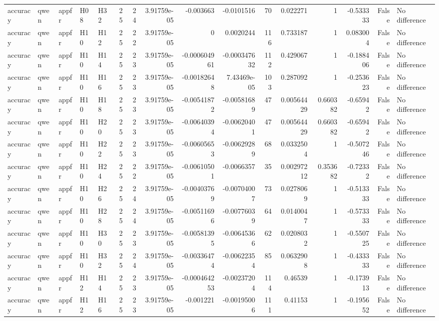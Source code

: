 \begin{longtable}{lllllrrrrrrrrrrl}
accuracy & qwen & appfr & H08 & H32 & 25 & 24 & 3.91759e-05 & -0.003663 & -0.0101516 & 70 & 0.022271 & 1 & -0.533333 & False & No difference \\
accuracy & qwen & appfr & H10 & H12 & 25 & 22 & 3.91759e-05 & 0 & 0.0020244 & 116 & 0.733187 & 1 & 0.083004 & False & No difference \\
accuracy & qwen & appfr & H10 & H14 & 25 & 23 & 3.91759e-05 & -0.000604961 & -0.000347632 & 112 & 0.429067 & 1 & -0.188406 & False & No difference \\
accuracy & qwen & appfr & H10 & H16 & 25 & 23 & 3.91759e-05 & -0.00182648 & 7.43469e-05 & 103 & 0.287092 & 1 & -0.253623 & False & No difference \\
accuracy & qwen & appfr & H10 & H18 & 25 & 23 & 3.91759e-05 & -0.00541872 & -0.00581689 & 47 & 0.00564429 & 0.660382 & -0.65942 & False & No difference \\
accuracy & qwen & appfr & H10 & H20 & 25 & 23 & 3.91759e-05 & -0.00640394 & -0.00620401 & 47 & 0.00564429 & 0.660382 & -0.65942 & False & No difference \\
accuracy & qwen & appfr & H10 & H22 & 25 & 23 & 3.91759e-05 & -0.00605653 & -0.00629289 & 68 & 0.0332504 & 1 & -0.507246 & False & No difference \\
accuracy & qwen & appfr & H10 & H24 & 25 & 22 & 3.91759e-05 & -0.00610501 & -0.0066357 & 35 & 0.00297212 & 0.353682 & -0.72332 & False & No difference \\
accuracy & qwen & appfr & H10 & H26 & 25 & 24 & 3.91759e-05 & -0.00403769 & -0.00704007 & 73 & 0.0278069 & 1 & -0.513333 & False & No difference \\
accuracy & qwen & appfr & H10 & H28 & 25 & 24 & 3.91759e-05 & -0.00511696 & -0.00776039 & 64 & 0.0140047 & 1 & -0.573333 & False & No difference \\
accuracy & qwen & appfr & H10 & H30 & 25 & 23 & 3.91759e-05 & -0.00581395 & -0.00645366 & 62 & 0.0208032 & 1 & -0.550725 & False & No difference \\
accuracy & qwen & appfr & H10 & H32 & 25 & 24 & 3.91759e-05 & -0.00336474 & -0.00622354 & 85 & 0.0632908 & 1 & -0.433333 & False & No difference \\
accuracy & qwen & appfr & H12 & H14 & 25 & 23 & 3.91759e-05 & -0.000464253 & -0.00237204 & 114 & 0.46539 & 1 & -0.173913 & False & No difference \\
accuracy & qwen & appfr & H12 & H16 & 25 & 23 & 3.91759e-05 & -0.001221 & -0.00195006 & 111 & 0.41153 & 1 & -0.195652 & False & No difference \\

\end{longtable}
